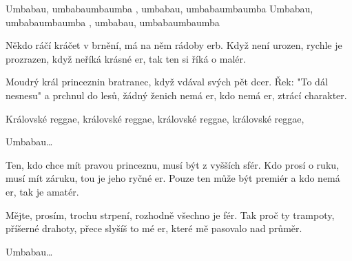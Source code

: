 
\beginverse*{}
Umbabau, umbabaumbaumba , umbabau, umbabaumbaumba
Umbabau, umbabaumbaumba , umbabau, umbabaumbaumba
\endverse{}

\beginverse{}
Někdo ráčí kráčet v brnění, má na něm rádoby erb.
Když není urozen, rychle je prozrazen,
když neříká krásné er, tak ten si říká o malér.
\endverse{}

\beginverse{}
Moudrý král princeznin bratranec, když vdával svých pět dcer.
Řek: "To dál nesnesu" a prchnul do lesů,
žádný ženich nemá er, kdo nemá er, ztrácí charakter.
\endverse{}

\beginchorus{}
Královské reggae, královské reggae,
královské reggae, královské reggae,
\endchorus{}

\beginverse*{}
Umbabau\ldots{}
\endverse{}

\beginverse{}
Ten, kdo chce mít pravou princeznu, musí být z vyšších sfér.
Kdo prosí o ruku, musí mít záruku, tou je jeho ryčné er.
Pouze ten může být premiér a kdo nemá er, tak je amatér.
\endverse{}

\beginverse{}
Mějte, prosím, trochu strpení, rozhodně všechno je fér.
Tak proč ty trampoty, příšerné drahoty,
přece slyšíš to mé er, které mě pasovalo nad průměr.
\endverse{}

\beginchorus{}
\phantom{}
\endchorus{}

\beginverse*{}
Umbabau\ldots{}
\endverse{}

\endsong{}

